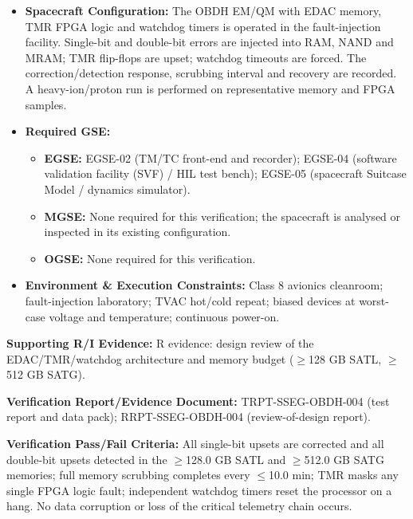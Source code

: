 \begin{itemize}
\item \textbf{Spacecraft Configuration:} The OBDH EM/QM with EDAC memory, TMR FPGA logic and watchdog timers is operated in the fault-injection facility. Single-bit and double-bit errors are injected into RAM, NAND and MRAM; TMR flip-flops are upset; watchdog timeouts are forced. The correction/detection response, scrubbing interval and recovery are recorded. A heavy-ion/proton run is performed on representative memory and FPGA samples.
\item \textbf{Required GSE:}
\begin{itemize}
\item \textbf{EGSE:} EGSE-02 (TM/TC front-end and recorder); EGSE-04 (software validation facility (SVF) / HIL test bench); EGSE-05 (spacecraft Suitcase Model / dynamics simulator).
\item \textbf{MGSE:} None required for this verification; the spacecraft is analysed or inspected in its existing configuration.
\item \textbf{OGSE:} None required for this verification.
\end{itemize}
\item \textbf{Environment \& Execution Constraints:} Class 8 avionics cleanroom; fault-injection laboratory; TVAC hot/cold repeat; biased devices at worst-case voltage and temperature; continuous power-on.
\end{itemize}
\par\textbf{Supporting R/I Evidence:} R evidence: design review of the EDAC/TMR/watchdog architecture and memory budget ($\ge$128 GB SATL, $\ge$512 GB SATG).
\par\textbf{Verification Report/Evidence Document:} TRPT-SSEG-OBDH-004 (test report and data pack); RRPT-SSEG-OBDH-004 (review-of-design report).
\par\textbf{Verification Pass/Fail Criteria:} All single-bit upsets are corrected and all double-bit upsets detected in the $\ge$128.0 GB SATL and $\ge$512.0 GB SATG memories; full memory scrubbing completes every $\le$10.0 min; TMR masks any single FPGA logic fault; independent watchdog timers reset the processor on a hang. No data corruption or loss of the critical telemetry chain occurs.
\par\medskip
